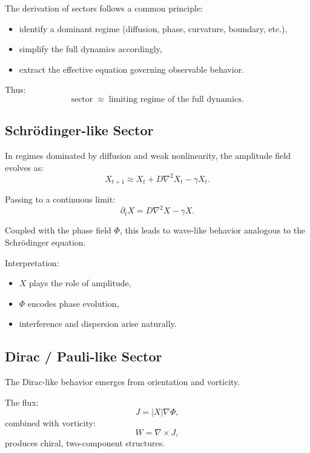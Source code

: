 \documentclass[11pt]{article}
\begin{document}
The derivation of sectors follows a common principle:

\begin{itemize}
\item identify a dominant regime (diffusion, phase, curvature, boundary, etc.),
\item simplify the full dynamics accordingly,
\item extract the effective equation governing observable behavior.
\end{itemize}

Thus:
\begin{equation}
\text{sector} \;\approx\; \text{limiting regime of the full dynamics}.
\end{equation}

\subsection{Schrödinger-like Sector}

In regimes dominated by diffusion and weak nonlinearity, the amplitude field evolves as:
\begin{equation}
X_{t+1} \approx X_t + D \nabla^2 X_t - \gamma X_t.
\end{equation}

Passing to a continuous limit:
\begin{equation}
\partial_t X = D \nabla^2 X - \gamma X.
\end{equation}

Coupled with the phase field $\Phi$, this leads to wave-like behavior analogous to the Schrödinger equation.

Interpretation:
\begin{itemize}
\item $X$ plays the role of amplitude,
\item $\Phi$ encodes phase evolution,
\item interference and dispersion arise naturally.
\end{itemize}

\subsection{Dirac / Pauli-like Sector}

The Dirac-like behavior emerges from orientation and vorticity.

The flux:
\begin{equation}
J = |X| \nabla \Phi,
\end{equation}
combined with vorticity:
\begin{equation}
W = \nabla \times J,
\end{equation}
produces chiral, two-component structures.
\end{document}

